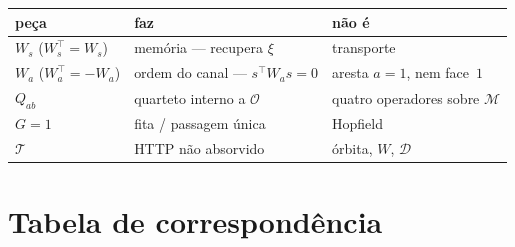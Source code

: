 \documentclass[11pt,a4paper]{article}
\begin{document}
\begin{center}\small
\begin{tabular}{@{}lll@{}}
\toprule
peça & faz & não é \\
\midrule
$W_s$ ($W_s^{\top}=W_s$) & memória --- recupera $\xi$ & transporte \\
$W_a$ ($W_a^{\top}=-W_a$) & ordem do canal --- $s^{\top}W_as=0$ & aresta $a{=}1$, nem face~$1$ \\
$Q_{ab}$ & quarteto interno a $\mathcal{O}$ & quatro operadores sobre $\mathcal{M}$ \\
$G{=}1$ & fita / passagem única & Hopfield \\
$\mathcal{T}$ & HTTP não absorvido & órbita, $W$, $\mathcal{D}$ \\
\bottomrule
\end{tabular}
\end{center}

\section{Tabela de correspondência}\label{redes:tabela}
\end{document}
